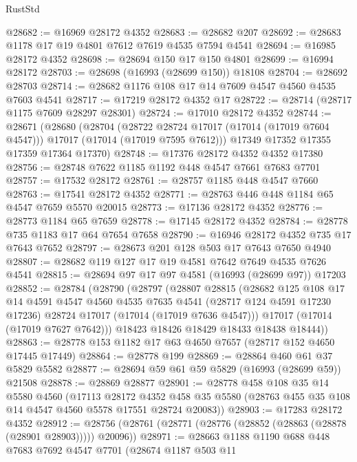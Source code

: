 \begin{lexlean}{RustStd}
\begin{coremodule}
@28682 := @16969 @28172 @4352
@28683 := @28682 @207
@28692 := @28683 @1178 @17 @19 @4801 @7612 @7619 @4535 @7594 @4541
@28694 := @16985 @28172 @4352
@28698 := @28694 @150 @17 @150 @4801
@28699 := @16994 @28172
@28703 := @28698 (@16993 (@28699 @150)) @18108
@28704 := @28692 @28703
@28714 := @28682 @1176 @108 @17 @14 @7609 @4547 @4560 @4535 @7603 @4541
@28717 := @17219 @28172 @4352 @17
@28722 := @28714 (@28717 @1175 @7609 @28297 @28301)
@28724 := @17010 @28172 @4352
@28744 := @28671
    (@28680
      (@28704
        (@28722 @28724 @17017 (@17014 (@17019 @7604 @4547)))
        @17017
        (@17014 (@17019 @7595 @7612)))
      @17349
      @17352
      @17355
      @17359
      @17364
      @17370)
@28748 := @17376 @28172 @4352 @4352 @17380
@28756 := @28748 @7622 @1185 @1192 @448 @4547 @7661 @7683 @7701
@28757 := @17532 @28172
@28761 := @28757 @1185 @448 @4547 @7660
@28763 := @17541 @28172 @4352
@28771 := @28763 @446 @448 @1184 @65 @4547 @7659 @5570 @20015
@28773 := @17136 @28172 @4352
@28776 := @28773 @1184 @65 @7659
@28778 := @17145 @28172 @4352
@28784 := @28778 @735 @1183 @17 @64 @7654 @7658
@28790 := @16946 @28172 @4352 @735 @17 @7643 @7652
@28797 := @28673 @201 @128 @503 @17 @7643 @7650 @4940
@28807 := @28682 @119 @127 @17 @19 @4581 @7642 @7649 @4535 @7626 @4541
@28815 := @28694 @97 @17 @97 @4581 (@16993 (@28699 @97)) @17203
@28852 := @28784
    (@28790
      (@28797
        (@28807
          @28815
          (@28682
            @125
            @108
            @17
            @14
            @4591
            @4547
            @4560
            @4535
            @7635
            @4541
            (@28717 @124 @4591 @17230 @17236)
            @28724
            @17017
            (@17014 (@17019 @7636 @4547)))
          @17017
          (@17014 (@17019 @7627 @7642)))
        @18423
        @18426
        @18429
        @18433
        @18438
        @18444))
@28863 := @28778 @153 @1182 @17 @63 @4650 @7657 (@28717 @152 @4650 @17445 @17449)
@28864 := @28778 @199
@28869 := @28864 @460 @61 @37 @5829 @5582
@28877 := @28694 @59 @61 @59 @5829 (@16993 (@28699 @59)) @21508
@28878 := @28869 @28877
@28901 := @28778
    @458
    @108
    @35
    @14
    @5580
    @4560
    (@17113
      @28172
      @4352
      @458
      @35
      @5580
      (@28763 @455 @35 @108 @14 @4547 @4560 @5578 @17551 @28724 @20083))
@28903 := @17283 @28172 @4352
@28912 := @28756 (@28761 (@28771 (@28776 (@28852 (@28863 (@28878 (@28901 @28903))))) @20096))
@28971 := @28663
    @1188
    @1190
    @688
    @448
    @7683
    @7692
    @4547
    @7701
    (@28674
      @1187
      @503
      @11

\end{coremodule}
\end{lexlean}
